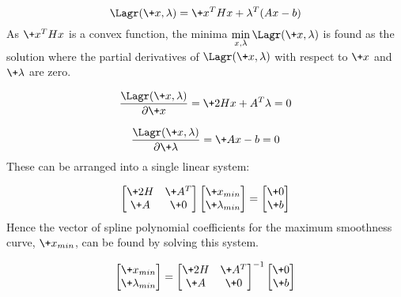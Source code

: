 \documentclass{article}
\begin{document}
\begin{equation}
    \Lagr(\+{x, \lambda}) = \+{x^THx + \lambda^T(Ax - b)}
\end{equation}
As $\+{x^THx}$ is a convex function, the minima $\displaystyle\min_{x, \lambda}\Lagr(\+{x, \lambda})$ is found as the solution
where the partial derivatives of $\Lagr(\+{x, \lambda})$ with respect to $\+x$ and $\+\lambda$
are zero.

\begin{equation}
    \frac{\Lagr(\+{x, \lambda})}{\partial{\+x}} = \+{2Hx + A^T\lambda} = 0
\end{equation}

\begin{equation}
    \frac{\Lagr(\+{x, \lambda})}{\partial{\+\lambda}} = \+{Ax - b} = 0
\end{equation}
These can be arranged into a single linear system:

\begin{equation}
    \begin{bmatrix}
        \+{2H} & \+{A^T} \\
        \+{A} & \+{0}
    \end{bmatrix}
    \begin{bmatrix}
        \+{x_{min}} \\
        \+{\lambda_{min}}
    \end{bmatrix} = 
    \begin{bmatrix}
        \+{0} \\
        \+{b}
    \end{bmatrix}
\end{equation}
Hence the vector of spline polynomial coefficients for the maximum smoothness curve, $\+{x_{min}}$,
can be found by solving this system.

\begin{equation}
    \label{eq:final_linear_prob}
    \begin{bmatrix}
        \+{x_{min}} \\
        \+{\lambda_{min}}
    \end{bmatrix} = 
    \begin{bmatrix}
        \+{2H} & \+{A^T} \\
        \+{A} & \+{0}
    \end{bmatrix}^{-1}
    \begin{bmatrix}
        \+{0} \\
        \+{b}
    \end{bmatrix}
\end{equation}
\end{document}
